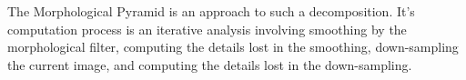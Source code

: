 The Morphological Pyramid is an approach to such a
decomposition. It's computation process is an iterative analysis
involving smoothing by the morphological filter, computing the
details lost in the smoothing, down-sampling the current image, and
computing the details lost in the down-sampling.





